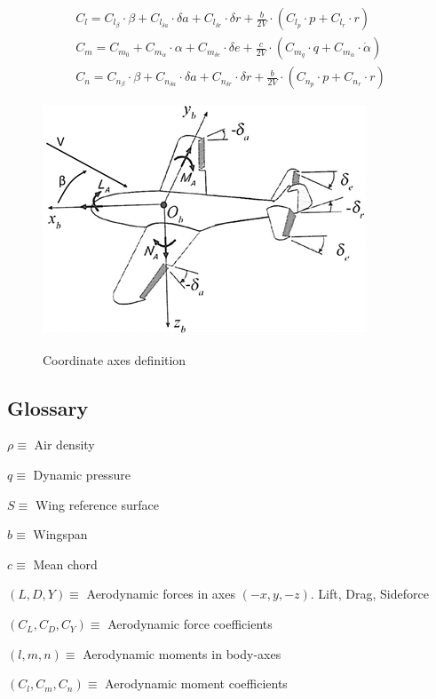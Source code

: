 \documentclass[12pt]{article}
\begin{document}
\begin{equation}\label{eq2}
\begin{gathered}
    C_l=C_{l_{\beta}} \cdot \beta + C_{l_{\delta a}} \cdot \delta a + C_{l_{\delta r}} \cdot \delta r + \frac{b}{2V} \cdot (C_{l_p} \cdot p + C_{l_r} \cdot r) \\
    C_m=C_{m_0} + C_{m_{\alpha}} \cdot \alpha + C_{m_{\delta e}} \cdot \delta e + \frac{c}{2V} \cdot (C_{m_q} \cdot q + C_{m_{\dot{\alpha}}} \cdot \dot{\alpha}) \\
    C_n=C_{n_{\beta}} \cdot \beta + C_{n_{\delta a}} \cdot \delta a + C_{n_{\delta r}} \cdot \delta r + \frac{b}{2V} \cdot (C_{n_p} \cdot p + C_{n_r} \cdot r)
\end{gathered}
\end{equation}

\setcounter{figure}{0}
\begin{figure}[H]
\centering
\includegraphics[width = .6\textwidth]{signs}
\label{fig:A.1}
\caption{Coordinate axes definition}
\end{figure}

\subsection{Glossary}

$\rho \equiv$ Air density

$q \equiv$ Dynamic pressure

$S \equiv$ Wing reference surface

$b \equiv$ Wingspan

$c \equiv$ Mean chord

$(L, D, Y) \equiv$ Aerodynamic forces in axes $(-x, y, -z)$. Lift, Drag, Sideforce

$(C_L, C_D, C_Y) \equiv$ Aerodynamic force coefficients

$(l, m, n) \equiv$ Aerodynamic moments in body-axes

$(C_l, C_m, C_n) \equiv$ Aerodynamic moment coefficients
\end{document}
